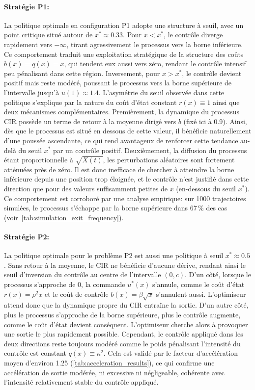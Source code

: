 \paragraph{Stratégie P1:} La politique optimale en configuration P1 adopte une structure à seuil, avec un point critique situé autour de \(x^* \approx 0.33\). Pour \(x < x^*\), le contrôle diverge rapidement vers \(-\infty\), tirant agressivement le processus vers la borne inférieure. Ce comportement traduit une exploitation stratégique de la structure des coûts \(b(x) = q(x) = x\), qui tendent eux aussi vers zéro, rendant le contrôle intensif peu pénalisant dans cette région. Inversement, pour \(x > x^*\), le contrôle devient positif mais reste modéré, poussant le processus vers la borne supérieure de l'intervalle jusqu'à \(u(1)\approx1.4\). L'asymétrie du seuil observée dans cette politique s'explique par la nature du coût d'état constant \(r(x)\equiv1\) ainsi que deux mécanismes complémentaires. Premièrement, la dynamique du processus \acs{CIR} possède un terme de retour à la moyenne dirigé vers \(b\) (fixé ici à 0.9). Ainsi, dès que le processus est situé en dessous de cette valeur, il bénéficie naturellement d'une poussée ascendante, ce qui rend avantageux de renforcer cette tendance au-delà du seuil \(x^*\) par un contrôle positif. Deuxièmement, la diffusion du processus étant proportionnelle à \(\sqrt{X(t)}\), les perturbations aléatoires sont fortement atténuées près de zéro. Il est donc inefficace de chercher à atteindre la borne inférieure depuis une position trop éloignée, et le contrôle n'est justifié dans cette direction que pour des valeurs suffisamment petites de \(x\) (en-dessous du seuil $x^*$). Ce comportement est corroboré par une analyse empirique: sur 1000 trajectoires simulées, le processus s'échappe par la borne supérieure dans 67\,\% des cas (voir~\ref{tab:simulation_exit_frequency}).
\paragraph{Stratégie P2:} La politique optimale pour le problème P2 est aussi une politique à seuil $x^*\approx0.5$. Sans retour à la moyenne, le \acs{CIR} ne bénéficie d'aucune dérive, rendant ainsi le seuil d'inversion du contrôle au centre de l'intervalle \((0,c)\). D'un côté, lorsque le processus s'approche de 0, la commande \(u^*(x)\) s'annule, comme le coût d'état \(r(x)=\rho^2x\) et le coût de contrôle \(b(x)=\beta\sqrt{x}\) s'annulent aussi. L'optimiseur attend donc que la dynamique propre du \acs{CIR} entraîne la sortie. D'un autre côté, plus le processus s'approche de la borne supérieure, plus le contrôle augmente, comme le coût d'état devient conséquent. L'optimiseur cherche alors à provoquer une sortie le plus rapidement possible. Cependant, le contrôle appliqué dans les deux directions reste toujours modéré comme le poids pénalisant l'intensité du contrôle est constant \(q(x)\equiv\kappa^2\). Cela est validé par le facteur d'accélération moyen d'environ 1.25 (\ref{tab:acceleration_results}), ce qui confirme une accélération de sortie modérée, ni excessive ni négligeable, cohérente avec l'intensité relativement stable du contrôle appliqué.
